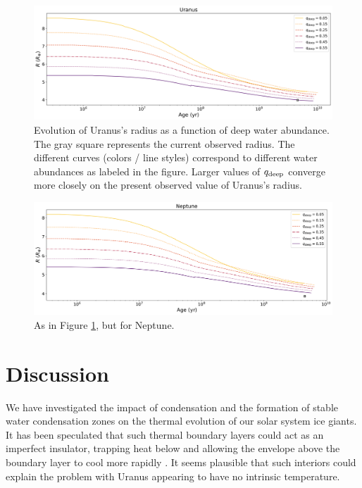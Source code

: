 \documentclass[11pt]{ucscthesisbs}
\begin{document}
\begin{figure}[h]
 \centerline{
  \includegraphics[width=\columnwidth]{figures/u_cooling_radius_nz_4096_logx_more_qdeeps.png}
 }
\caption[Thermal Evolution Curves for Uranus - Radius]
{Evolution of Uranus's radius as a function of deep water abundance. The gray square represents the current observed radius. The different curves (colors / line styles) correspond to different water abundances as labeled in the figure. Larger values of $q_{\rm deep}$ converge more closely on the present observed value of Uranus's radius. }
\label{fig:evolve_uranus_radius}
\end{figure}


\begin{figure}[h]
 \centerline{
  \includegraphics[width=\columnwidth]{figures/n_cooling_radius_nz_4096_logx.png}
 }
\caption[Thermal Evolution Curves for Neptune - Radius]
{As in Figure \ref{fig:evolve_uranus_radius}, but for Neptune.}
\label{fig:evolve_neptune_radius}
\end{figure}



\chapter{Discussion}
We have investigated the impact of condensation and the formation of stable water condensation zones on the thermal evolution of our solar system ice giants. It has been speculated that such thermal boundary layers could act as an imperfect insulator, trapping heat below and allowing the envelope above the boundary layer to cool more rapidly \citep{nettelmann_2016,friedson_2017,leconte_2017,podolak_1991,2019A&A...632A..70S}. It seems plausible that such interiors could explain the problem with Uranus appearing to have no intrinsic temperature. 
\end{document}
